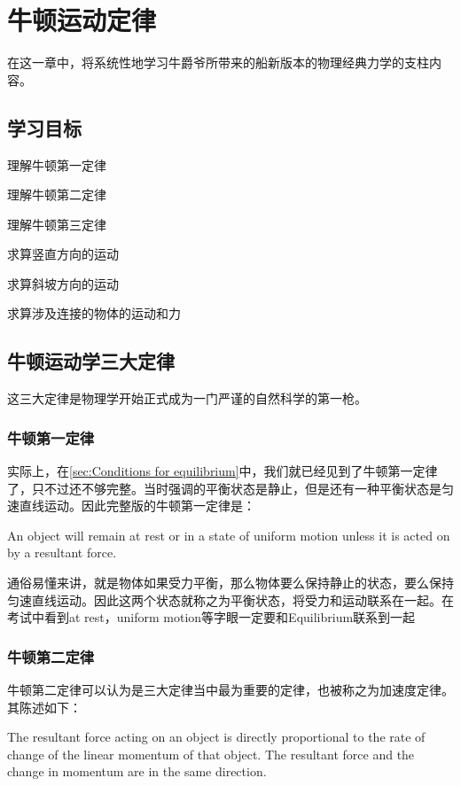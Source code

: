 
\chapter{牛顿运动定律}
\label{ch:Newton's Law of Motion}
在这一章中，将系统性地学习牛爵爷所带来的船新版本的物理经典力学的支柱内容。

\section*{学习目标}
\begin{todolist}
	\item 理解牛顿第一定律
	\item 理解牛顿第二定律
	\item 理解牛顿第三定律
	\item 求算竖直方向的运动
	\item 求算斜坡方向的运动
	\item 求算涉及连接的物体的运动和力
\end{todolist}
\clearpage

\section{牛顿运动学三大定律}
这三大定律是物理学开始正式成为一门严谨的自然科学的第一枪。
\subsection*{牛顿第一定律}
实际上，在\ref{sec:Conditions for equilibrium}中，我们就已经见到了牛顿第一定律了，只不过还不够完整。当时强调的平衡状态是静止，但是还有一种平衡状态是匀速直线运动。因此完整版的牛顿第一定律是：
\begin{theorem}
An object will remain at rest or in a state of uniform motion unless it is acted on by a resultant force.
\end{theorem}
通俗易懂来讲，就是物体如果受力平衡，那么物体要么保持静止的状态，要么保持匀速直线运动。因此这两个状态就称之为平衡状态，将受力和运动联系在一起。在考试中看到at rest，uniform motion等字眼一定要和Equilibrium联系到一起

\subsection*{牛顿第二定律}
牛顿第二定律可以认为是三大定律当中最为重要的定律，也被称之为加速度定律。其陈述如下：
\begin{theorem}
The resultant force acting on an object is directly proportional to the rate of change of the linear momentum of that object. The resultant force and the change in momentum are in the same direction.
\end{theorem}


